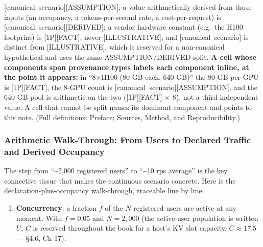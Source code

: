 \mbox{{[}canonical scenario{]}}\hspace{0pt}\mbox{{[}ASSUMPTION{]}}; a value arithmetically derived
from those inputs (an occupancy, a tokens-per-second rate, a
cost-per-request) is \mbox{{[}canonical scenario{]}}\hspace{0pt}\mbox{{[}DERIVED{]}}; a vendor
hardware constant (e.g.~the H100 footprint) is \mbox{{[}1P{]}}\hspace{0pt}\mbox{{[}FACT{]}}, never
\mbox{{[}ILLUSTRATIVE{]}}; and \mbox{{[}canonical scenario{]}} is distinct from
\mbox{{[}ILLUSTRATIVE{]}}, which is reserved for a non-canonical hypothetical
and uses the same ASSUMPTION/DERIVED split. \textbf{A cell whose
components span provenance types labels each component inline, at the
point it appears:} in ``8×H100 (80 GB each, 640 GB)'' the 80 GB per GPU
is \mbox{{[}1P{]}}\hspace{0pt}\mbox{{[}FACT{]}}, the 8-GPU count is \mbox{{[}canonical
scenario{]}}\hspace{0pt}\mbox{{[}ASSUMPTION{]}}, and the 640 GB pool is arithmetic on the
two (\mbox{{[}1P{]}}\hspace{0pt}\mbox{{[}FACT{]}} × 8), not a third independent value. A cell that
cannot be split names its dominant component and points to this note.
(Full definitions: Preface; Sources, Method, and Reproducibility.)

\subsubsection{Arithmetic Walk‑Through: From Users to Declared Traffic
and Derived
Occupancy}\label{arithmetic-walkthrough-from-users-to-declared-traffic-and-derived-occupancy}

The step from ``\textasciitilde2,000 registered users'' to
``\textasciitilde10 rps average'' is the key connective tissue that
makes the continuous scenario concrete. Here is the
declaration-plus-occupancy walk-through, traceable line by line:

\begin{enumerate}
\def\labelenumi{\arabic{enumi}.}
\tightlist
\item
  \textbf{Concurrency}: a fraction \(f\) of the \(N\) registered users
  are active at any moment. With \(f = 0.05\) and \(N = 2{,}000\) (the
  active-user population is written \(U\); \(C\) is reserved throughout
  the book for a host's KV slot capacity, \(C ≈ 17.5\) --- §4.6, Ch 17):
\end{enumerate}


